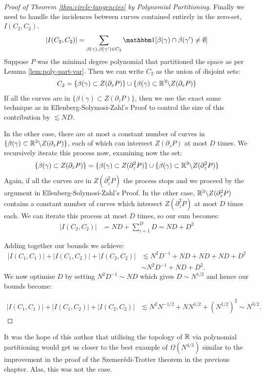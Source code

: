 \begin{proof}[Proof of Theorem \ref{thm:circle-tangencies} by Polynomial Partitioning]
Finally we need to handle the incidences between curves contained entirely in the zero-set, $I(C_2,C_2)$. 
\[
    |I(C_2,C_2)| = \sum_{\beta(\gamma), \beta(\gamma') \in C_2} \OO[\beta(\gamma) \cap \beta(\gamma') \neq \emptyset]
\]
Suppose $P$ was the minimal degree polynomial that partitioned the space as per Lemma \ref{lem:poly-part-var}. Then we can write $C_2$ as the union of disjoint sets:
\[
C_2 = \{\beta(\gamma) \subset Z(\partial_z P)\} \cup \{\beta(\gamma) \subset \mathbb R^3 \backslash Z(\partial_z P)\}
\]
If all the curves are in $\{\beta(\gamma) \subset Z(\partial_z P)\}$, then we use the exact same technique as in Ellenberg-Solymosi-Zahl's Proof to control the size of this contribution by $\lesssim ND$.

In the other case, there are at most a constant number of curves in $\{\beta(\gamma) \subset \mathbb R^3 \backslash Z(\partial_z P)\}$, each of which can intersect $ Z(\partial_z P)$ at most $D$ times. 
We recursively iterate this process now, examining now the set: 
\[\{\beta(\gamma) \subset Z(\partial_z P)\} = \{\beta(\gamma) \subset Z(\partial^2_z P)\} \cup \{\beta(\gamma) \subset \mathbb R^3 \backslash Z(\partial^2_z P)\}\]
Again, if all the curves are in $Z(\partial^2_z P)$ the process stops and we proceed by the argument in Ellenberg-Solymosi-Zahl's Proof. In the other case, $\mathbb R^3 \backslash Z(\partial^2_z P)$
contains a constant number of curves which intersect $ Z(\partial^2_z P)$ at most $D$ times each. We can iterate this process at most $D$ times, so our sum becomes:
\begin{align*}
    |I(C_2,C_2)| &= ND + \sum_{i=1}^D D = ND + D^2
\end{align*}

Adding together our bounds we achieve:
\begin{align*}
    |I(C_1,C_1)|+|I(C_1,C_2)|+|I(C_2,C_2)| &\lesssim N^2D^{-1} + ND + ND + ND + D^2 \\
    &\sim N^2D^{-1} + ND + D^2.
\end{align*}
We now optimise $D$ by setting $N^2D^{-1} \sim ND$ which gives $D \sim N^{1/2}$ and hence our bounds become:

\begin{align*}
    |I(C_1,C_1)|+|I(C_1,C_2)|+|I(C_2,C_2)| &\lesssim N^2N^{-1/2} + NN^{1/2} + (N^{1/2})^2 \sim N^{3/2}.
\end{align*}
\end{proof}
\begin{remark}
It was the hope of this author that utilising the topology of $\mathbb R$ via polynomial partitioning would get us closer to the best example of $\Omega(N^{4/3})$ 
similar to the improvement in the proof of the Szemerédi-Trotter theorem in the previous chapter. Alas, this was not the case.
\end{remark}

